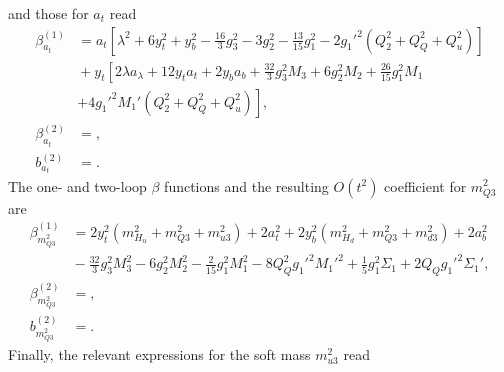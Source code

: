 \documentclass[preprint,amsmath,amssymb,aps,superscriptaddress,prd,showpacs,floatfix,nofootinbib]{revtex4-1}
\begin{document}
and those for $a_t$ read
\begin{subequations}
\begin{align}
\beta_{a_t}^{(1)}&=a_t\left [ \lambda^2+6y_t^2+y_b^2-\frac{16}{3}g_3^2-3g_2^2-\frac{13}{15}g_1^2-2g_1'^2\left ( Q_2^2+Q_Q^2+Q_u^2 \right )\right ]\nonumber\\
&{}+y_t\left [ 2\lambda a_\lambda + 12y_ta_t+2y_ba_b+\frac{32}{3}g_3^2M_3+6g_2^2M_2+\frac{26}{15}g_1^2M_1\right.\nonumber\\
&{}\left.+4g_1'^2M_1'\left ( Q_2^2+Q_Q^2+Q_u^2 \right )\right ],\label{eq:USSMTYu22BetaOneLoop}\\
\beta_{a_t}^{(2)}&=,\label{eq:USSMTYu22BetaTwoLoop}\\
b_{a_t}^{(2)}&=.\label{eq:USSMTYu22Ot2Coeff}
\end{align}
\end{subequations}
The one- and two-loop $\beta$ functions and the resulting $O(t^2)$ coefficient for $m_{Q3}^2$ are 
\begin{subequations}
\begin{align}
\beta_{m_{Q3}^2}^{(1)}&=2y_t^2\left ( m_{H_u}^2+m_{Q3}^2+m_{u3}^2\right )+2a_t^2+2y_b^2\left ( m_{H_d}^2+m_{Q3}^2+m_{d3}^2\right )+2a_b^2\nonumber\\
&{}-\frac{32}{3}g_3^2M_3^2-6g_2^2M_2^2-\frac{2}{15}g_1^2M_1^2-8Q_Q^2g_1'^2M_1'^2+\frac{1}{5}g_1^2\Sigma_1+2Q_Qg_1'^2\Sigma_1',\label{eq:USSMmq222BetaOneLoop}\\
\beta_{m_{Q3}^2}^{(2)}&=,\label{eq:USSMmq222BetaTwoLoop}\\
b_{m_{Q3}^2}^{(2)}&=.\label{eq:USSMmq222Ot2Coeff}
\end{align}
\end{subequations}
Finally, the relevant expressions for the soft mass $m_{u3}^2$ read
\end{document}
